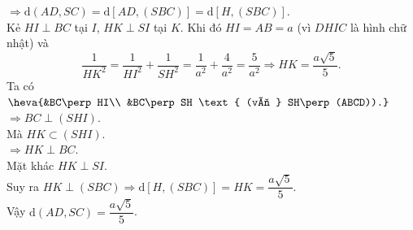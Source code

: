 \begin{bt}
{\begin{enumerate}
	$\Rightarrow \mathrm{d}(AD,SC) = \mathrm{d}[AD,(SBC)] = \mathrm{d}[H,(SBC)]$.\\
	Kẻ $HI\perp BC$ tại $I$, $HK\perp SI$ tại $K$. Khi đó $HI=AB=a$ (vì $DHIC$ là hình chữ nhật) và 
	$$\dfrac{1}{HK^2} = \dfrac{1}{HI^2} + \dfrac{1}{SH^2} = \dfrac{1}{a^2} + \dfrac{4}{a^2} = \dfrac{5}{a^2} \Rightarrow HK=\dfrac{a\sqrt{5}}{5}.$$
	Ta có $\heva{&BC\perp HI\\ &BC\perp SH \text{ (vì } SH\perp (ABCD)).}$\\
	$\Rightarrow BC\perp (SHI)$.\\
	Mà $HK\subset (SHI)$.\\
	$\Rightarrow HK\perp BC$.\\
	Mặt khác $HK\perp SI$.\\
	Suy ra $HK\perp (SBC)\Rightarrow \mathrm{d}[H,(SBC)] = HK = \dfrac{a\sqrt{5}}{5}$.\\
	Vậy $\mathrm{d}(AD,SC)=\dfrac{a\sqrt{5}}{5}$.
	\end{enumerate}	
	}
\end{bt}
